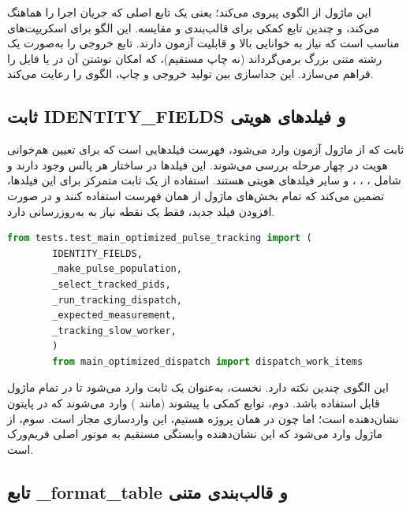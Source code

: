 این ماژول از الگوی  پیروی می‌کند؛ یعنی یک تابع اصلی  که جریان اجرا را هماهنگ می‌کند، و چندین تابع کمکی برای قالب‌بندی و مقایسه. این الگو برای اسکریپت‌های  مناسب است که نیاز به خوانایی بالا و قابلیت آزمون دارند. تابع  خروجی را به‌صورت یک رشته متنی بزرگ برمی‌گرداند (نه چاپ مستقیم)، که امکان نوشتن آن در  یا فایل را فراهم می‌سازد. این جداسازی بین تولید خروجی و چاپ، الگوی  را رعایت می‌کند.

\subsection{ثابت IDENTITY\_FIELDS و فیلدهای هویتی}

ثابت  که از ماژول آزمون وارد می‌شود، فهرست فیلدهایی است که برای تعیین هم‌خوانی هویت در چهار مرحله بررسی می‌شوند. این فیلدها در ساختار  هر پالس وجود دارند و شامل ، ، ،  و سایر فیلدهای هویتی هستند. استفاده از یک ثابت متمرکز برای این فیلدها، تضمین می‌کند که تمام بخش‌های ماژول از همان فهرست استفاده کنند و در صورت افزودن فیلد جدید، فقط یک نقطه نیاز به به‌روزرسانی دارد.

\begin{LTR}
	\begin{lstlisting}[language=Python]
		from tests.test_main_optimized_pulse_tracking import (
		IDENTITY_FIELDS,
		_make_pulse_population,
		_select_tracked_pids,
		_run_tracking_dispatch,
		_expected_measurement,
		_tracking_slow_worker,
		)
		from main_optimized_dispatch import dispatch_work_items
	\end{lstlisting}
\end{LTR}

این الگوی  چندین نکته دارد. نخست،  به‌عنوان یک ثابت وارد می‌شود تا در تمام ماژول قابل استفاده باشد. دوم، توابع کمکی با پیشوند \lr{\_} (مانند ) وارد می‌شوند که در پایتون نشان‌دهنده  است؛ اما چون در همان پروژه هستیم، این واردسازی مجاز است. سوم،  از ماژول  وارد می‌شود که این نشان‌دهنده وابستگی مستقیم به موتور  اصلی فریم‌ورک است.

\subsection{تابع \_format\_table و قالب‌بندی متنی}


